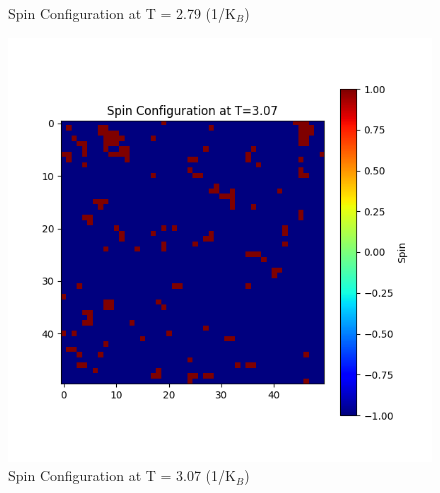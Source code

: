 \documentclass[11pt]{article}
\begin{document}
\begin{figure}[H]
\begin{minipage}{0.32\textwidth}
        \caption{Spin Configuration at T = 2.79 (1/K$_B$)}
        \label{fig:8}
    \end{minipage}
        \begin{minipage}{0.32\textwidth}
        \centering
        \includegraphics[width=\textwidth]{Spin_Configuration_at_T=3.07.png}
        \caption{Spin Configuration at T = 3.07 (1/K$_B$)}
        \label{fig:9}
    \end{minipage}\hfill
\end{figure}
\end{document}
